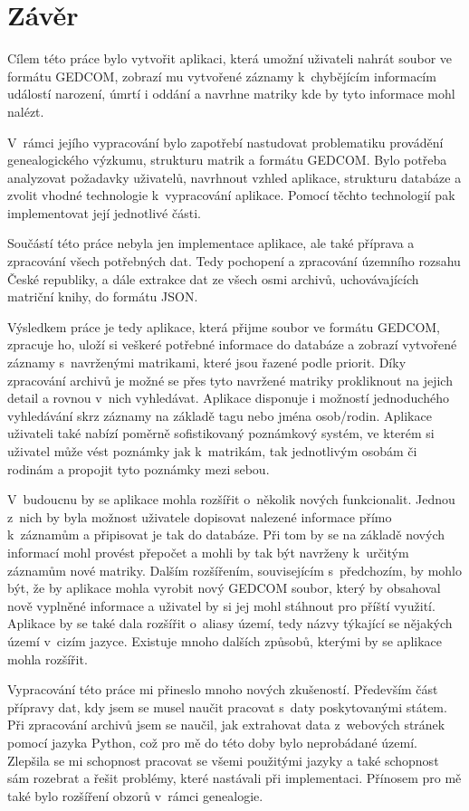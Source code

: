\chapter{Závěr}

Cílem této práce bylo vytvořit aplikaci, která umožní uživateli nahrát soubor ve formátu GEDCOM, zobrazí mu vytvořené záznamy k~chybějícím informacím událostí narození, úmrtí i oddání a navrhne matriky kde by tyto informace mohl nalézt. 

V~rámci jejího vypracování bylo zapotřebí nastudovat problematiku provádění genealogického výzkumu, strukturu matrik a formátu GEDCOM. Bylo potřeba analyzovat požadavky uživatelů, navrhnout vzhled aplikace, strukturu databáze a zvolit vhodné technologie k~vypracování aplikace. Pomocí těchto technologií pak implementovat její jednotlivé části.

Součástí této práce nebyla jen implementace aplikace, ale také příprava a zpracování všech potřebných dat. Tedy pochopení a zpracování územního rozsahu České republiky, a dále extrakce dat ze všech osmi archivů, uchovávajících matriční knihy, do formátu JSON.

Výsledkem práce je tedy aplikace, která přijme soubor ve formátu GEDCOM, zpracuje ho, uloží si veškeré potřebné informace do databáze a zobrazí vytvořené záznamy s~navrženými matrikami, které jsou řazené podle priorit. Díky zpracování archivů je možné se přes tyto navržené matriky prokliknout na jejich detail a rovnou v~nich vyhledávat. Aplikace disponuje i možností jednoduchého vyhledávání skrz záznamy na základě tagu nebo jména osob/rodin. Aplikace uživateli také nabízí poměrně sofistikovaný poznámkový systém, ve kterém si uživatel může vést poznámky jak k~matrikám, tak jednotlivým osobám či rodinám a propojit tyto poznámky mezi sebou.

V~budoucnu by se aplikace mohla rozšířit o~několik nových funkcionalit. Jednou z~nich by byla možnost uživatele dopisovat nalezené informace přímo k~záznamům a připisovat je tak do databáze. Při tom by se na základě nových informací mohl provést přepočet a mohli by tak být navrženy k~určitým záznamům nové matriky. Dalším rozšířením, souvisejícím s~předchozím, by mohlo být, že by aplikace mohla vyrobit nový GEDCOM soubor, který by obsahoval nově vyplněné informace a uživatel by si jej mohl stáhnout pro příští využití. Aplikace by se také dala rozšířit o~aliasy území, tedy názvy týkající se nějakých území v~cizím jazyce. Existuje mnoho dalších způsobů, kterými by se aplikace mohla rozšířit.

Vypracování této práce mi přineslo mnoho nových zkušeností. Především část přípravy dat, kdy jsem se musel naučit pracovat s~daty poskytovanými státem. Při zpracování archivů jsem se naučil, jak extrahovat data z~webových stránek pomocí jazyka Python, což pro mě do této doby bylo neprobádané území. Zlepšila se mi schopnost pracovat se všemi použitými jazyky a také schopnost sám rozebrat a řešit problémy, které nastávali při implementaci. Přínosem pro mě také bylo rozšíření obzorů v~rámci genealogie.